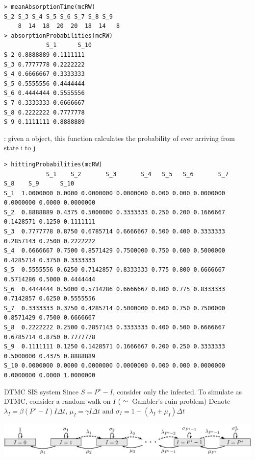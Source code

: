 \documentclass[aspectratio=169]{beamer}
\begin{document}
\begin{frame}[fragile]
\begin{lstlisting}
> meanAbsorptionTime(mcRW)
S_2 S_3 S_4 S_5 S_6 S_7 S_8 S_9 
    8  14  18  20  20  18  14   8 
> absorptionProbabilities(mcRW)
            S_1      S_10
S_2 0.8888889 0.1111111
S_3 0.7777778 0.2222222
S_4 0.6666667 0.3333333
S_5 0.5555556 0.4444444
S_6 0.4444444 0.5555556
S_7 0.3333333 0.6666667
S_8 0.2222222 0.7777778
S_9 0.1111111 0.8888889
\end{lstlisting}
\end{frame}


\begin{frame}[fragile]
: given a  object, this function calculates the probability of ever arriving from state i to j

\begin{lstlisting}
> hittingProbabilities(mcRW)
            S_1    S_2       S_3       S_4   S_5   S_6       S_7       S_8    S_9      S_10
S_1  1.0000000 0.0000 0.0000000 0.0000000 0.000 0.000 0.0000000 0.0000000 0.0000 0.0000000
S_2  0.8888889 0.4375 0.5000000 0.3333333 0.250 0.200 0.1666667 0.1428571 0.1250 0.1111111
S_3  0.7777778 0.8750 0.6785714 0.6666667 0.500 0.400 0.3333333 0.2857143 0.2500 0.2222222
S_4  0.6666667 0.7500 0.8571429 0.7500000 0.750 0.600 0.5000000 0.4285714 0.3750 0.3333333
S_5  0.5555556 0.6250 0.7142857 0.8333333 0.775 0.800 0.6666667 0.5714286 0.5000 0.4444444
S_6  0.4444444 0.5000 0.5714286 0.6666667 0.800 0.775 0.8333333 0.7142857 0.6250 0.5555556
S_7  0.3333333 0.3750 0.4285714 0.5000000 0.600 0.750 0.7500000 0.8571429 0.7500 0.6666667
S_8  0.2222222 0.2500 0.2857143 0.3333333 0.400 0.500 0.6666667 0.6785714 0.8750 0.7777778
S_9  0.1111111 0.1250 0.1428571 0.1666667 0.200 0.250 0.3333333 0.5000000 0.4375 0.8888889
S_10 0.0000000 0.0000 0.0000000 0.0000000 0.000 0.000 0.0000000 0.0000000 0.0000 1.0000000
\end{lstlisting}
\end{frame}

\begin{frame}{DTMC SIS system}
    Since $S=P^\star-I$, consider only the infected. To simulate as DTMC, consider a random walk on $I$ ($\simeq$ Gambler's ruin problem)
    \vfill
    Denote $\lambda_I = \beta (P^\star-I)I\Delta t$, $\mu_I = \gamma I\Delta t$ and $\sigma_I=1-(\lambda_I+\mu_I)\Delta t$
    \vfill
    \begin{center}
        \includegraphics[width=\textwidth]{FIGS/figure_SIS_random_walk.png}
    \end{center}
\end{frame}
\end{document}
